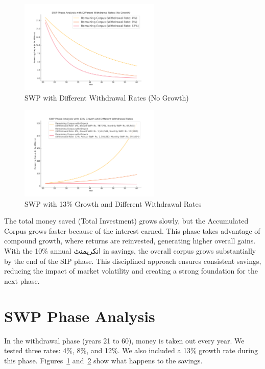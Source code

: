 \documentclass[a4paper,12pt]{article}
\begin{document}
\begin{figure}[!h]
	\centering
	\includegraphics[width=0.6\textwidth]{swp_rate_simulations.png}
	\caption{SWP with Different Withdrawal Rates (No Growth)}
	\label{fig:swp-phase}
\end{figure}

\begin{figure}[!h]
	\centering
	\includegraphics[width=0.6\textwidth]{swp_growth_rate_simulations_with_swp_amounts.png}
	\caption{SWP with 13\% Growth and Different Withdrawal Rates}
	\label{fig:swp-growth-phase}
\end{figure}
		
		The total money saved (Total Investment) grows slowly, but the Accumulated Corpus grows faster because of the interest earned. This phase takes advantage of compound growth, where returns are reinvested, generating higher overall gains. With the 10\% annual انکریمنٹ in savings, the overall corpus grows substantially by the end of the SIP phase. This disciplined approach ensures consistent savings, reducing the impact of market volatility and creating a strong foundation for the next phase.
		
		\section{SWP Phase Analysis}
		In the withdrawal phase (years 21 to 60), money is taken out every year. We tested three rates: 4\%, 8\%, and 12\%. We also included a 13\% growth rate during this phase. Figures~\ref{fig:swp-phase} and~\ref{fig:swp-growth-phase} show what happens to the savings.
	
\end{document}
